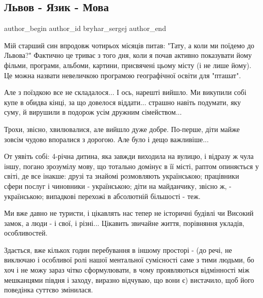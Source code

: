  
 
 
 
 
 
\subsection{Львов - Язик - Мова}
\label{sec:26_07_2021.fb.bryhar_sergej.1.lvov_poezd_rebenok}
 
\ifcmt
 author_begin
   author_id bryhar_sergej
 author_end
\fi

Мій старший син впродовж чотирьох місяців питав: "Тату, а коли ми поїдемо до
Львова?" Фактично це триває з того дня, коли я почав активно показувати йому
фільми, програми, альбоми, картини, присвячені цьому місту (і не лише йому). Це
можна назвати невеличкою програмою географічної освіти для "пташат".

Але з поїздкою все не складалося... І ось, нарешті вийшло. Ми викупили собі
купе в обидва кінці, за що довелося віддати... страшно навіть подумати, яку
суму, й вирушили в подорож усім дружним сімейством...

Трохи, звісно, хвилювалися, але вийшло дуже добре. По-перше, діти майже зовсім чудово впоралися з дорогою. Але було і дещо важливіше...

От уявіть собі: 4-річна дитина, яка завжди виходила на вулицю, і відразу ж чула
іншу, погано зрозумілу мову, що тотально домінує в її місті, раптом опиняється
у світі, де все інакше: друзі та знайомі розмовляють українською; працівники
сфери послуг і чиновники - українською; діти на майданчику, звісно ж, -
українською; випадкові перехожі в абсолютній більшості - теж. 

Ми вже давно не туристи, і цікавлять нас тепер не історичні будівлі чи Високий
замок, а люди - і свої, і різні... Цікавить звичайне життя, порівняння укладів,
особливостей.

Здається, вже кількох годин перебування в іншому просторі - (до речі, не
виключаю і особливої ролі нашої ментальної сумісності саме з тими людьми, бо
хоч і не можу зараз чітко сформулювати, в чому проявляються відмінності між
мешканцями півдня і заходу, виразно відчуваю, що вони є) вистачило, щоб його
поведінка суттєво змінилася. 

